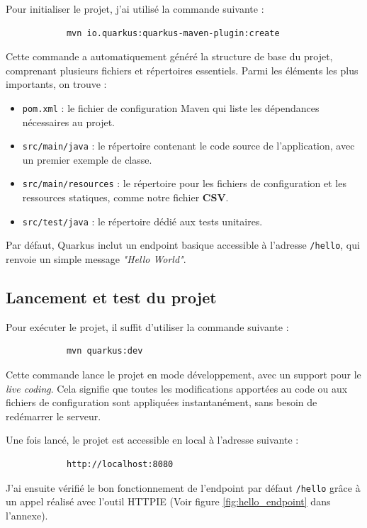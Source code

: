 \documentclass[11pt]{article}
\begin{document}
		Pour initialiser le projet, j’ai utilisé la commande suivante :
		\begin{verbatim}
			mvn io.quarkus:quarkus-maven-plugin:create
		\end{verbatim}
		
		Cette commande a automatiquement généré la structure de base du projet, comprenant plusieurs fichiers et répertoires essentiels. Parmi les éléments les plus importants, on trouve :
		\begin{itemize}
			\item \texttt{pom.xml} : le fichier de configuration Maven qui liste les dépendances nécessaires au projet.
			\item \texttt{src/main/java} : le répertoire contenant le code source de l’application, avec un premier exemple de classe.
			\item \texttt{src/main/resources} : le répertoire pour les fichiers de configuration et les ressources statiques, comme notre fichier \textbf{CSV}.
			\item \texttt{src/test/java} : le répertoire dédié aux tests unitaires.
		\end{itemize}
		
		Par défaut, Quarkus inclut un endpoint basique accessible à l’adresse \texttt{/hello}, qui renvoie un simple message \textit{"Hello World"}.
		
		\subsection{Lancement et test du projet}
		
		Pour exécuter le projet, il suffit d’utiliser la commande suivante :
		\begin{verbatim}
			mvn quarkus:dev
		\end{verbatim}
		
		Cette commande lance le projet en mode développement, avec un support pour le \textit{live coding}. Cela signifie que toutes les modifications apportées au code ou aux fichiers de configuration sont appliquées instantanément, sans besoin de redémarrer le serveur.
		
		Une fois lancé, le projet est accessible en local à l’adresse suivante :
		\begin{verbatim}
			http://localhost:8080
		\end{verbatim}
		
		J’ai ensuite vérifié le bon fonctionnement de l’endpoint par défaut \texttt{/hello} grâce à un appel réalisé avec l’outil HTTPIE (Voir figure \ref{fig:hello_endpoint} dans l'annexe).
		
\end{document}
